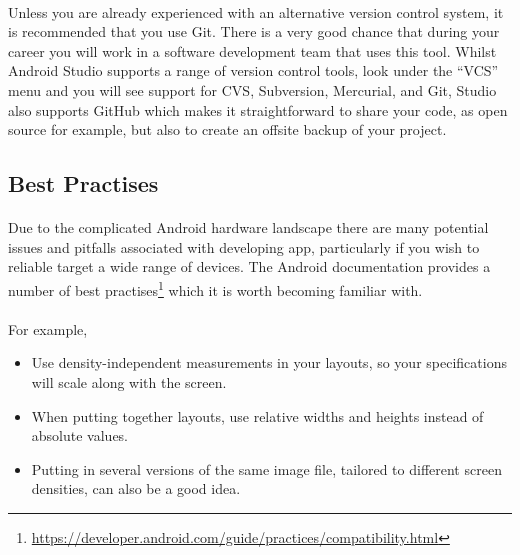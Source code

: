 \documentclass[12pt, a4paper, twoside]{book}
\begin{document}
\paragraph{} Unless you are already experienced with an alternative version control system, it is recommended that you use Git. There is a very good chance that during your career you will work in a software development team that uses this tool. Whilst Android Studio supports a range of version control tools, look under the ``VCS'' menu and you will see support for CVS, Subversion, Mercurial, and Git, Studio also supports GitHub which makes it straightforward to share your code, as open source for example, but also to create an offsite backup of your project.

\subsection{Best Practises}
\paragraph{} Due to the complicated Android hardware landscape there are many potential issues and pitfalls associated with developing app, particularly if you wish to reliable target a wide range of devices. The Android documentation provides a number of best practises\footnote{\url{https://developer.android.com/guide/practices/compatibility.html}} which it is worth becoming familiar with.

\paragraph{} For example,

\begin{itemize}
\item Use density-independent measurements in your layouts, so your specifications will scale along with the screen.
\item When putting together layouts, use relative widths and heights instead of absolute values.
\item Putting in several versions of the same image file, tailored to different screen densities, can also be a good idea.
\end{itemize}
\end{document}

